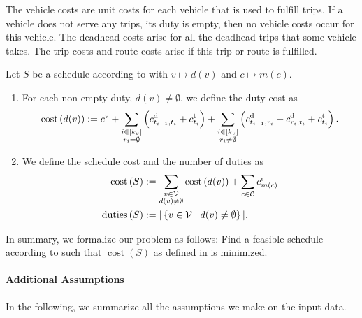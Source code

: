 The vehicle costs are unit costs for each vehicle that is used to fulfill trips. If a vehicle does not serve any trips, \ie its duty is empty, then no vehicle costs occur for this vehicle. The deadhead costs arise for all the deadhead trips that some vehicle takes. The trip costs and route costs arise if this trip or route is fulfilled.

\begin{definition}
\label{def:schedule_cost}

Let $S$ be a schedule according to  with ${v\mapsto d(v)}$ and ${c\mapsto m(c)}$.
\begin{enumerate}
	\item
For each non-empty duty, \ie $d(v)\neq\emptyset$, we define the duty cost as
\begin{align*}
	\operatorname{cost}\left(d(v)\right) := c^{\operatorname{v}} + \sum_{\substack{i\in[k_v] \\ r_i=\emptyset}} \left(c^{\operatorname{d}}_{t_{i-1},t_i} + c^{\operatorname{t}}_{t_i}\right) + \sum_{\substack{i\in[k_v] \\ r_i\neq\emptyset}} \left(c^{\operatorname{d}}_{t_{i-1},r_i} + c^{\operatorname{d}}_{r_i,t_i} + c^{\operatorname{t}}_{t_i}\right).
\end{align*}

	\item
We define the schedule cost and the number of duties as
\begin{align*}
	\operatorname{cost}\left(S\right) & := \sum_{\substack{v\in\mathcal{V} \\ d(v)\neq\emptyset}} \operatorname{cost}\left(d(v)\right) + \sum_{c\in\mathcal{C}} c^{\operatorname{r}}_{m(c)} \\
	\operatorname{duties}\left(S\right) & := |\left\{v\in\mathcal{V}\mid d(v)\neq\emptyset\right\}|.
\end{align*}
\end{enumerate}

\end{definition}

In summary, we formalize our problem as follows: Find a feasible schedule according to  such that $\operatorname{cost}\left(S\right)$ as defined in  is minimized.

\paragraph{Additional Assumptions} \parfill

In the following, we summarize all the assumptions we make on the input data.

